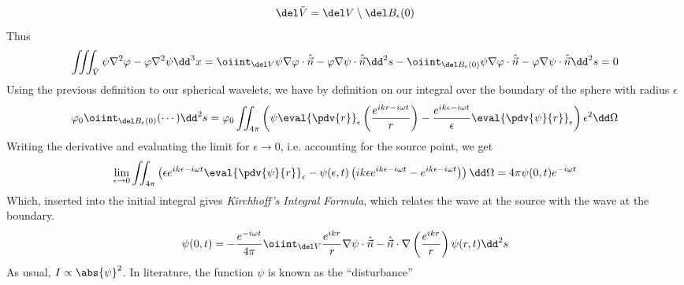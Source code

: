 \documentclass[../electromagnetism.tex]{subfiles}
\begin{document}
\begin{equation*}
	\del\tilde{V}=\del V\setminus\del B_\epsilon(0)
\end{equation*}
Thus
\begin{equation}
	\iiint_{\tilde{V}}\psi\nabla^2\varphi-\varphi\nabla^2\psi\dd^3x=\oiint_{\del V}\psi\nabla\varphi\cdot\hat{\vec{n}}-\varphi\nabla\psi\cdot\hat{\vec{n}}\dd^2s-\oiint_{\del B_\epsilon(0)}\psi\nabla\varphi\cdot\hat{\vec{n}}-\varphi\nabla\psi\cdot\hat{\vec{n}}\dd^2s=0
	\label{eq:greenidcor.diff}
\end{equation}
Using the previous definition to our spherical wavelets, we have by definition on our integral over the boundary of the sphere with radius $\epsilon$
\begin{equation}
	\varphi_0\oiint_{\del B_\epsilon(0)}(\cdots)\dd^2s=\varphi_0\iint_{4\pi}\left( \psi\eval{\pdv{r}}_\epsilon\left( \frac{e^{ikr-i\omega t}}{r} \right)-\frac{e^{ik\epsilon-i\omega t}}{\epsilon}\eval{\pdv{\psi}{r}}_\epsilon \right)\epsilon^2\dd\Omega
	\label{eq:kint1.diff}
\end{equation}
Writing the derivative and evaluating the limit for $\epsilon\to0$, i.e. accounting for the source point, we get
\begin{equation}
	\lim_{\epsilon\to0}\iint_{4\pi}\left( \epsilon e^{ik\epsilon-i\omega t}\eval{\pdv{\psi}{r}}_\epsilon-\psi(\epsilon, t)\left( ik\epsilon e^{ik\epsilon-i\omega t}-e^{ik\epsilon-i\omega t} \right) \right)\dd\Omega=4\pi\psi(0, t)e^{-i\omega t}
	\label{eq:resultneeded.diff}
\end{equation}
Which, inserted into the initial integral gives \textit{Kirchhoff's Integral Formula}, which relates the wave at the source with the wave at the boundary.
\begin{equation}
	\psi(0, t)=-\frac{e^{-i\omega t}}{4\pi}\oiint_{\del V}\frac{e^{ikr}}{r}\nabla\psi\cdot\hat{\vec{n}}-\hat{\vec{n}}\cdot\nabla\left( \frac{e^{ikr}}{r} \right)\psi(r, t)\dd^2s
	\label{eq:kirchhoffintegral.diff}
\end{equation}
As usual, $I\propto\abs{\psi}^2$. In literature, the function $\psi$ is known as the ``disturbance''
\end{document}
